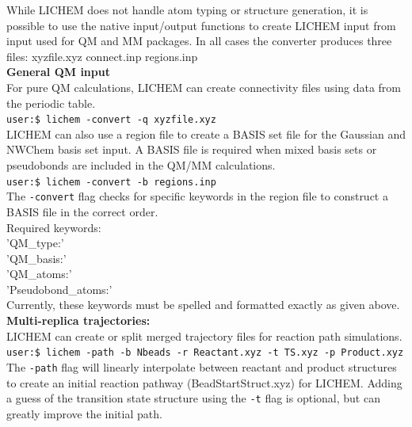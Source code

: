 \documentclass[12pt]{report}
\begin{document}
While LICHEM does not handle atom typing or structure generation, it is
possible to use the native input/output functions to create LICHEM input from
input used for QM and MM packages.
In all cases the converter produces three files: xyzfile.xyz connect.inp
regions.inp \\

{\textbf{General QM input}} \\

For pure QM calculations, LICHEM can create connectivity files using data
from the periodic table. \\

\texttt{user:\$ lichem -convert -q xyzfile.xyz} \\

LICHEM can also use a region file to create a BASIS set file for the Gaussian
and NWChem basis set input.
A BASIS file is required when mixed basis sets or pseudobonds are included
in the QM/MM calculations. \\

\texttt{user:\$ lichem -convert -b regions.inp} \\

The \texttt{-convert} flag checks for specific keywords in the region file to construct
a BASIS file in the correct order. \\

Required keywords: \\
'QM\_type:' \\
'QM\_basis:' \\
'QM\_atoms:' \\
'Pseudobond\_atoms:' \\

Currently, these keywords must be spelled and formatted exactly as given
above. \\

{\textbf{Multi-replica trajectories:}} \\

LICHEM can create or split merged trajectory files for reaction path
simulations. \\

\texttt{user:\$ lichem -path -b Nbeads -r Reactant.xyz -t TS.xyz -p Product.xyz} \\

The \texttt{-path} flag will linearly interpolate between reactant and product
structures to create an initial reaction pathway (BeadStartStruct.xyz) for
LICHEM.
Adding a guess of the transition state structure using the \texttt{-t} flag is optional,
but can greatly improve the initial path. \\
\end{document}
